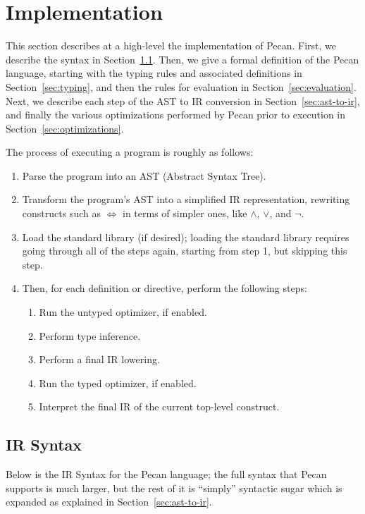 \section{Implementation}\label{sec:implementation}

This section describes at a high-level the implementation of Pecan.
First, we describe the syntax in Section~\ref{sec:ir-syntax}.
Then, we give a formal definition of the Pecan language, starting with the typing rules and associated definitions in Section~\ref{sec:typing}, and then the rules for evaluation in Section~\ref{sec:evaluation}.
Next, we describe each step of the AST to IR conversion in Section~\ref{sec:ast-to-ir}, and finally the various optimizations performed by Pecan prior to execution in Section~\ref{sec:optimizations}.

The process of executing a program is roughly as follows:

\begin{enumerate}
    \item Parse the program into an AST (Abstract Syntax Tree).
    \item Transform the program's AST into a simplified IR  representation, rewriting constructs such as $\iff$ in terms of simpler ones, like $\land$, $\lor$, and $\lnot$.
    \item Load the standard library (if desired); loading the standard library requires going through all of the steps again, starting from step 1, but skipping this step.
    \item Then, for each definition or directive, perform the following steps:
        \begin{enumerate}
            \item Run the untyped optimizer, if enabled.
            \item Perform type inference.
            \item Perform a final IR lowering.
            \item Run the typed optimizer, if enabled.
            \item Interpret the final IR of the current top-level construct.
        \end{enumerate}
\end{enumerate}

\subsection{IR Syntax}\label{sec:ir-syntax}

Below is the IR Syntax for the Pecan language; the full syntax that Pecan supports is much larger, but the rest of it is ``simply'' syntactic sugar which is expanded as explained in Section~\ref{sec:ast-to-ir}.

